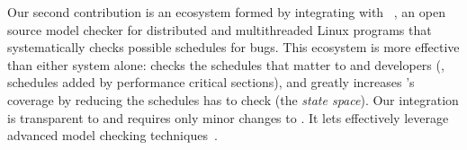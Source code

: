
Our second contribution is an ecosystem formed by integrating \xxx with
\dbug~\cite{dbug:spin11}, an open source model checker for 
distributed and multithreaded Linux programs that systematically checks possible schedules for bugs.
This \ecosys ecosystem is more effective than
either system alone: \dbug checks the schedules
that matter to \xxx and developers (\eg, schedules added by performance
critical sections), and \xxx greatly increases \dbug's coverage by
reducing the schedules \dbug has to check (the \emph{state space}). Our
integration is transparent to \dbug and requires only minor
changes to \xxx.  It lets \xxx effectively leverage advanced model
checking techniques~\cite{flanagan:dynamicpo, demeter:sosp11}.



